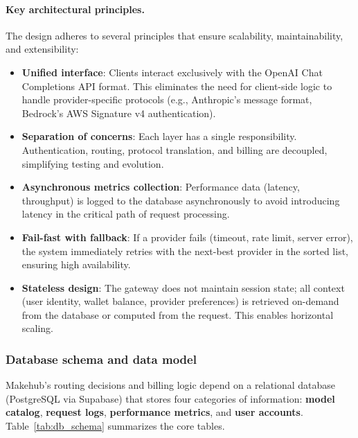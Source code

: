 \documentclass[english]{article}
\begin{document}
\paragraph{Key architectural principles.}

The design adheres to several principles that ensure scalability, maintainability, and extensibility:

\begin{itemize}
    \item \textbf{Unified interface}: Clients interact exclusively with the OpenAI Chat Completions API format. This eliminates the need for client-side logic to handle provider-specific protocols (e.g., Anthropic's message format, Bedrock's AWS Signature v4 authentication).

    \item \textbf{Separation of concerns}: Each layer has a single responsibility. Authentication, routing, protocol translation, and billing are decoupled, simplifying testing and evolution.

    \item \textbf{Asynchronous metrics collection}: Performance data (latency, throughput) is logged to the database asynchronously to avoid introducing latency in the critical path of request processing.

    \item \textbf{Fail-fast with fallback}: If a provider fails (timeout, rate limit, server error), the system immediately retries with the next-best provider in the sorted list, ensuring high availability.

    \item \textbf{Stateless design}: The gateway does not maintain session state; all context (user identity, wallet balance, provider preferences) is retrieved on-demand from the database or computed from the request. This enables horizontal scaling.
\end{itemize}


\subsubsection{Database schema and data model}

Makehub's routing decisions and billing logic depend on a relational database (PostgreSQL via Supabase) that stores four categories of information: \textbf{model catalog}, \textbf{request logs}, \textbf{performance metrics}, and \textbf{user accounts}. Table~\ref{tab:db_schema} summarizes the core tables.
\end{document}
